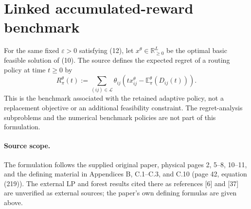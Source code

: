 \documentclass{article}
\begin{document}
\section*{Linked accumulated-reward benchmark}

For the same fixed $\varepsilon>0$ satisfying (12), let $x^\theta\in\mathbb R_{\geq0}^{L}$ be the optimal basic feasible solution of (10). The source defines the expected regret of a routing policy at time $t\geq0$ by
\begin{equation}
R^\theta_\pi(t):=
\sum_{(ij)\in\mathcal L}\theta_{ij}
\left(tx^\theta_{ij}-\mathbb E^\theta_\pi(D_{ij}(t))\right).
\tag{13}
\end{equation}
This is the benchmark associated with the retained adaptive policy, not a replacement objective or an additional feasibility constraint. The regret-analysis subproblems and the numerical benchmark policies are not part of this formulation.

\paragraph{Source scope.}
The formulation follows the supplied original paper, physical pages 2, 5--8, 10--11, and the defining material in Appendices B, C.1--C.3, and C.10 (page 42, equation (219)). The external LP and forest results cited there as references [6] and [37] are unverified as external sources; the paper's own defining formulas are given above.
\end{document}
